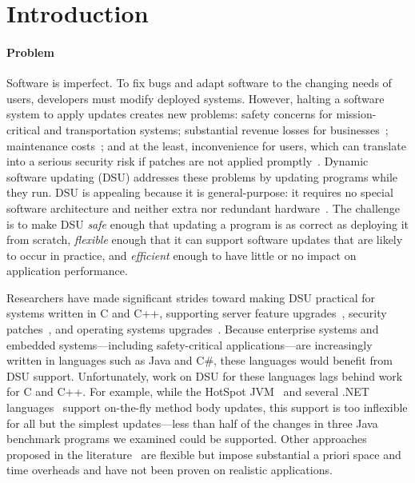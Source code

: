 
\section{Introduction}

\paragraph{Problem}
Software is imperfect.  To fix bugs and adapt software to the changing
needs of users, developers must modify deployed systems.  However,
halting a software system to apply updates creates new problems:
safety concerns for mission-critical and transportation systems;
substantial revenue losses for
businesses~\cite{gartner98downtime,roc1}; maintenance
costs~\cite{zorn05}; and at the least, inconvenience for users, which
can translate into a serious security risk if patches are not applied
promptly~\cite{altekar05opus,Ksplice}.  Dynamic software updating (DSU)
addresses these problems by updating programs while they run. DSU is
appealing because it is general-purpose: it requires no
special software architecture and neither extra nor redundant hardware~\cite{kspliceslashdot08}. The
challenge is to make DSU 
\emph{safe} enough that updating a program is as correct as
deploying it from scratch, \emph{flexible} enough that it can support
software updates that are likely to occur in practice, and
\emph{efficient} enough to have little or no impact on application
performance.

Researchers have made significant strides toward making DSU practical
for systems written in C and C++, supporting server feature
upgrades~\cite{neamtiu06dsu,chen:icse07}, security
patches~\cite{altekar05opus}, and operating systems
upgrades~\cite{K42reconfig,k42usenix,dynamos_eurosys_07,chen06vee,Ksplice}.
Because enterprise
systems and embedded systems---including safety-critical
applications---are increasingly written in languages such as
Java and C\#, these languages would benefit from DSU support.
Unfortunately, work on DSU for these languages lags behind work for
C and C++.  For example, while the HotSpot JVM~\cite{JVMhotswap} and
several .NET languages~\cite{VSEnC} support on-the-fly method body
updates, this support is too inflexible for all but the simplest
updates---less than half of the changes in three Java benchmark programs we
examined could be supported.  Other approaches proposed in
the literature~\cite{ritzau00dynamic,Mala00a,orso:java} are
flexible but impose substantial a priori space and time overheads and
have not been proven on realistic applications.

